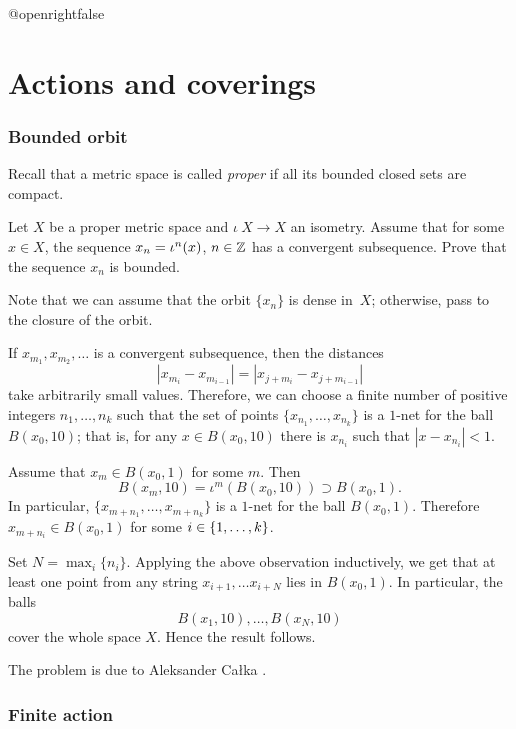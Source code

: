\csname @openrightfalse\endcsname
\chapter{Actions and coverings}

\subsection*{Bounded orbit}
\label{Bounded orbit}

Recall that a metric space is called \emph{proper} if all its bounded closed sets are compact.

\begin{pr} Let $X$ be a 
proper metric space 
and $\iota\:X\to X$ an isometry.
Assume that for some $x\in X$, the sequence $x_n\z=\iota^n(x)$, $n\in\mathbb{Z}$ has a convergent subsequence.
Prove that the sequence $x_n$ is bounded.
\end{pr}

Note that we can assume that the orbit $\{x_n\}$ is dense in~$X$;
otherwise, pass to the closure of the orbit.

If $x_{m_1},x_{m_2},\ldots$ is a convergent subsequence, then the distances
\[|x_{m_i}-x_{m_{i-1}}|=|x_{j+m_i}-x_{j+m_{i-1}}|\]
take arbitrarily small values.
Therefore, we can choose a finite number of positive integers $n_1,\ldots,n_k$
such that the set of points $\{x_{n_1},\ldots,x_{n_k}\}$ is a $1$-net for the ball $B(x_0,10)$;
that is, for any $x\in B(x_0,10)$ there is $x_{n_i}$ such that $|x-x_{n_i}|<1$.

Assume that $x_m\in B(x_0,1)$ for some $m$.
Then 
\[B(x_m,10)=\iota^m( B(x_0,10))\supset B(x_0,1).\]
In particular, $\{x_{m+n_1},\ldots,x_{m+n_k}\}$ is a $1$-net for the ball $B(x_0,1)$.
Therefore $x_{m+n_i}\in B(x_0,1)$ for some $i\z\in\{1,\ldots,k\}$.

Set $N=\max_i\{n_i\}$.
Applying the above observation inductively, we get that at least one point from any string $x_{i+1},\ldots x_{i+N}$ lies in $B(x_0,1)$.
In particular, the balls
\[B(x_{1},10),\ldots,B(x_N,10)\]
cover the whole space $X$.
Hence the result follows.\qeds

The problem is due to Aleksander Ca{\l}ka \cite{calka}.

\subsection*{Finite action}\label{Finite action}

